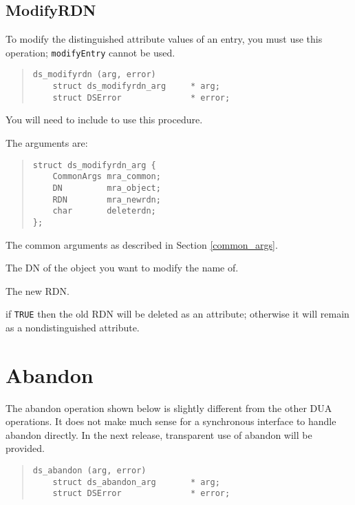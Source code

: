 \subsection {ModifyRDN}
\label{modifyrdn}

To modify the distinguished attribute values of an entry, you must use
this operation; \verb"modifyEntry" cannot be used.

\begin{quote}\small\begin{verbatim}
ds_modifyrdn (arg, error)
    struct ds_modifyrdn_arg     * arg;    
    struct DSError              * error;
\end{verbatim}\end{quote}

You will need to include  to use this procedure.

The arguments are:

\begin{quote}\small\begin{verbatim}
struct ds_modifyrdn_arg {
    CommonArgs mra_common;
    DN         mra_object;
    RDN        mra_newrdn;
    char       deleterdn; 
};
\end{verbatim}\end{quote}

\begin{describe}
\item [\verb"mra\_common":] The common arguments as described in Section
\ref{common_args}.
\item [\verb"mra\_object":] The DN of the object you want to modify the name
of.
\item [\verb"mra\_newrdn":] The new RDN.
\item [\verb"deleterdn":] if \verb"TRUE" then the old RDN will be
deleted as an attribute; otherwise it will remain as a nondistinguished
attribute.
\end{describe}

\section {Abandon}
The abandon operation shown below is slightly
different from the other DUA operations.
It does not make much sense for a synchronous interface to
handle abandon directly.
In the next release, transparent use of abandon will be provided.

\begin{quote}\small\begin{verbatim}
ds_abandon (arg, error)
    struct ds_abandon_arg       * arg;    
    struct DSError              * error;
\end{verbatim}\end{quote}

